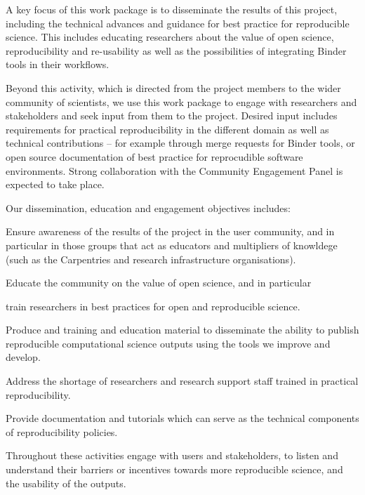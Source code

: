 \begin{workpackage}[id=education, wphases={0-12!0.48,12-24!0.48,24-36!0.71},
  title={Dissemination, education and engagement},
  short={Dissemination, education, and engagement},
  lead=IFR,
  IFRRM=10,
  MPRM=6,
  SRLRM=7,
  QSRM=3,
  UIORM=9,
  swsites
]


\begin{wpobjectives}
  A key focus of this work package is to disseminate the results of this
  project, including the technical advances and guidance for best practice for
  reproducible science. This includes educating researchers about the value of
  open science, reproducibility and re-usability as well as the possibilities of
  integrating Binder tools in their workflows.

  Beyond this activity, which is directed from the project members to the wider community of
  scientists, we use this work package to engage with researchers and
  stakeholders and seek input from them to the project. Desired input includes
  requirements for practical reproducibility in the different domain as well as
  technical contributions -- for example through merge requests for Binder
  tools, or open source documentation of best practice for reprocudible software
  environments. Strong collaboration with the Community Engagement Panel is expected to take place.

  Our dissemination, education and engagement objectives includes:
 \begin{compactitem}
   \item Ensure awareness of the results of the project in the user community,
     and in particular in those groups that act as educators and multipliers of
     knowldege (such as the Carpentries and research infrastructure organisations).
   \item Educate the community on the value of open science, and in particular
   \item train researchers in best practices for open and reproducible science.
   \item Produce and training and education material to disseminate the ability to
     publish reproducible computational science outputs using the tools we
     improve and develop.
   \item Address the shortage of researchers and research support staff trained
     in practical reproducibility.
   \item Provide documentation and tutorials which can serve as the technical
     components of reproducibility policies.
   \item Throughout these activities engage with users and stakeholders, to
     listen and understand their barriers or incentives towards more
     reproducible science, and the usability of the \TheProject outputs.
 \end{compactitem}
\end{wpobjectives}


\end{workpackage}
